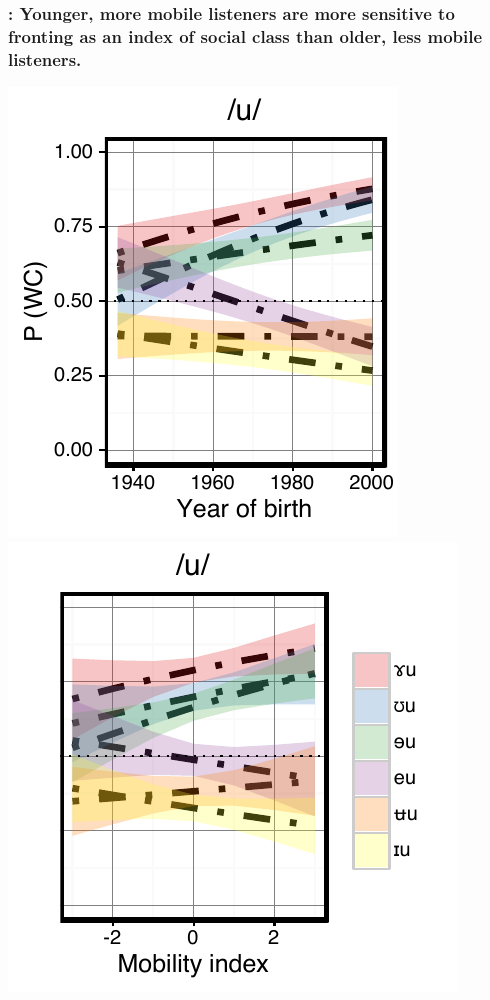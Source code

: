 \documentclass[a0,portrait]{a0poster}
\begin{document}
\begin{multicols}{4}
\subsubsection*{: Younger, more mobile listeners are more sensitive to fronting as an index of social class than older, less mobile listeners.}
\hspace*{-1.5cm}
\includegraphics[scale=2]{u_perception_age_sd.pdf}
\includegraphics[scale=2]{u_perception_dim3_sd.pdf}
\vspace*{-1.5cm}

\end{multicols}
\end{document}
